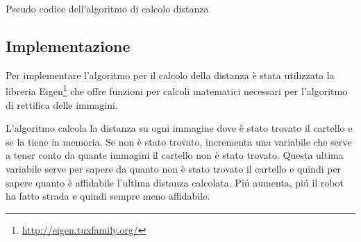 		\begin{algorithm}[htp]
		\SetAlgoLined
		\caption{Pseudo codice dell'algoritmo di calcolo distanza}
		\end{algorithm}

	\subsection{Implementazione}
		Per implementare l'algoritmo per il calcolo della distanza è stata utilizzata la libreria Eigen\footnote{\url{ http://eigen.tuxfamily.org/}} che offre funzioni per calcoli matematici necessari per l'algoritmo di rettifica delle immagini.

		L'algoritmo calcola la distanza su ogni immagine dove è stato trovato il cartello e se la tiene in memoria. Se non è stato trovato, incrementa una variabile che serve a tener conto da quante immagini il cartello non è stato trovato. Questa ultima variabile serve per sapere da quanto non è stato trovato il cartello e quindi per sapere quanto è affidabile l'ultima distanza calcolata. Pi\'u aumenta, pi\'u il robot ha fatto strada e quindi sempre meno affidabile.

